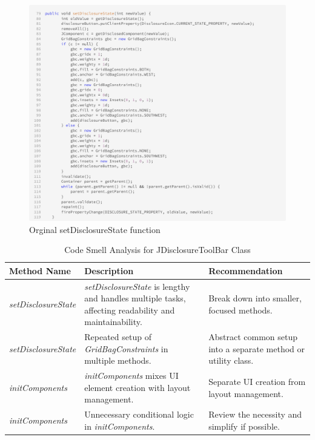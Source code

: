 \begin{figure}[H]
    \centering
    \includegraphics[width=\linewidth]{pic/setDisclosureState.png}
    \caption{Orginal setDisclosureState function}
    \label{fig:Orginal setDisclosureState function}
\end{figure}



\begin{table}[H]
    \centering
    \begin{tabular}{|l|p{6cm}|p{6cm}|}
        \hline
        \textbf{Method Name}        & \textbf{Description}                                                                                          & \textbf{Recommendation}                                        \\ \hline
        \textit{setDisclosureState} & \textit{setDisclosureState} is lengthy and handles multiple tasks, affecting readability and maintainability. & Break down into smaller, focused methods.                      \\ \hline
        \textit{setDisclosureState} & Repeated setup of \textit{GridBagConstraints} in multiple methods.                                            & Abstract common setup into a separate method or utility class. \\ \hline
        \textit{initComponents}     & \textit{initComponents} mixes UI element creation with layout management.                                     & Separate UI creation from layout management.                   \\ \hline
        \textit{initComponents}     & Unnecessary conditional logic in \textit{initComponents}.                                                     & Review the necessity and simplify if possible.                 \\ \hline
    \end{tabular}
    \caption{Code Smell Analysis for JDisclosureToolBar Class}
    \label{table:codesmell}
\end{table}

